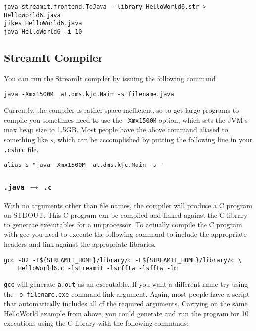 \begin{verbatim}
java streamit.frontend.ToJava --library HelloWorld6.str > HelloWorld6.java
jikes HelloWorld6.java
java HelloWorld6 -i 10
\end{verbatim}

\subsection{StreamIt Compiler}
You can run the StreamIt compiler by issuing the following command
\begin{verbatim}
java -Xmx1500M  at.dms.kjc.Main -s filename.java
\end{verbatim}

Currently, the compiler is rather space inefficient, so to get large 
programs to compile you sometimes need to use the {\tt -Xmx1500M} option,
which sets the JVM's max heap size to 1.5GB.
Most people have the above command aliased to something like {\tt s}, which
can be accomplished by putting the following line in your {\tt .cshrc} file.

\begin{verbatim}
alias s "java -Xmx1500M  at.dms.kjc.Main -s "
\end{verbatim}


\subsubsection{{\tt .java} $\rightarrow$ {\tt .c}}
With no arguments other than file names, the compiler will produce
a C program on STDOUT. This C program can be compiled 
and linked against the C library to generate executables for a 
uniprocessor. To actually compile the C program with gcc 
you need to execute the following command to include the appropriate
headers and link against the appropriate libraries.

\begin{verbatim}
gcc -O2 -I${STREAMIT_HOME}/library/c -L${STREAMIT_HOME}/library/c \
    HelloWorld6.c -lstreamit -lsrfftw -lsfftw -lm
\end{verbatim}

{\tt gcc} will generate {\tt a.out} as an executable. If you want a different
name try using the {\tt -o filename.exe} command link argument.
Again, most people have a script that
automatically includes all of the required arguments.
Carrying on the same HelloWorld example from above, you could generate
and run the program for 10 executions using the C library with the following
commands:

